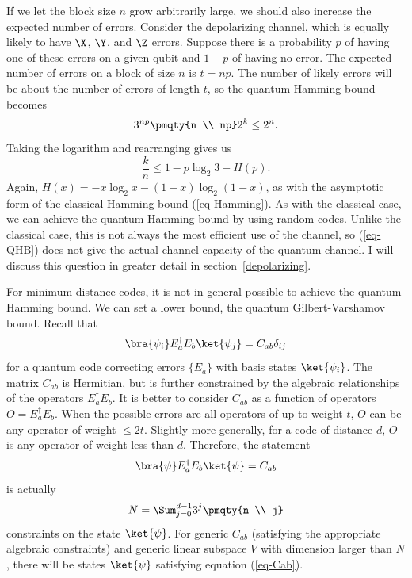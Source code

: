 If we let the block size $n$ grow arbitrarily large, we should also increase
the expected number of errors.  Consider the depolarizing channel, which is
equally likely to have $\X$, $\Y$, and $\Z$ errors.  Suppose there is a
probability $p$ of having one of these errors on a given qubit and $1-p$ of
having no error.  The expected number of errors on a block of size $n$ is $t
= np$.  The number of likely errors will be about the number of errors of
length $t$, so the quantum Hamming bound becomes
\begin{equation}
	3^{np} \pmqty{n \\ np} 2^k \leq 2^n.
\end{equation}
Taking the logarithm and rearranging gives us
\begin{equation}
	\frac{k}{n} \leq 1 - p \log_2 3 - H(p).
	\label{eq-QHB}
\end{equation}
Again, $H(x) = - x \log_2 x - (1 - x) \log_2 (1-x)$, as with the asymptotic
form of the classical Hamming bound (\ref{eq-Hamming}).  As with the
classical case, we can achieve the quantum Hamming bound by using
random codes.  Unlike the classical case, this is not always the most
efficient use of the channel, so (\ref{eq-QHB}) does not give the actual
channel capacity of the quantum channel.  I will discuss this question in
greater detail in section~\ref{depolarizing}.

For minimum distance codes, it is not in general possible to achieve the
quantum Hamming bound.  We can set a lower bound, the quantum
Gilbert-Varshamov bound.  Recall that
\begin{equation}
	\bra{\psi_i} E_a^\dagger E_b \ket{\psi_j} = C_{ab} \delta_{ij}
\end{equation}
for a quantum code correcting errors $\{E_a\}$ with basis states
$\ket{\psi_i}$.  The matrix $C_{ab}$ is Hermitian, but is further
constrained by the algebraic relationships of the operators $E_a^\dagger
E_b$.  It is better to consider $C_{ab}$ as a function of operators $O =
E_a^\dagger E_b$.  When the possible errors are all operators of up to
weight $t$, $O$ can be any operator of weight $\leq 2t$.  Slightly more
generally, for a code of distance $d$, $O$ is any operator of weight less
than $d$.  Therefore, the statement
\begin{equation}
	\bra{\psi} E_a^\dagger E_b \ket{\psi} = C_{ab}
	\label{eq-Cab}
\end{equation}
is actually
\begin{equation}
	N = \Sum_{j=0}^{d-1} 3^j \pmqty{n \\ j}
\end{equation}
constraints on the state $\ket{\psi}$.  For generic $C_{ab}$ (satisfying the
appropriate algebraic constraints) and generic linear subspace $V$ with
dimension larger than $N$, there will be states $\ket{\psi}$ satisfying
equation (\ref{eq-Cab}).

